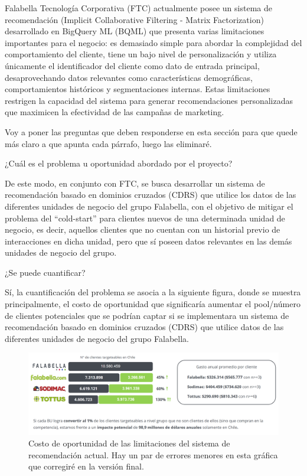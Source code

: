 \newpage

Falabella Tecnología Corporativa (FTC) actualmente posee un sistema de recomendación (Implicit Collaborative Filtering - Matrix Factorization) desarrollado en BigQuery ML (BQML) que presenta varias limitaciones importantes para el negocio: es demasiado simple para abordar la complejidad del comportamiento del cliente, tiene un bajo nivel de personalización y utiliza únicamente el identificador del cliente como dato de entrada principal, desaprovechando datos relevantes como características demográficas, comportamientos históricos y segmentaciones internas. Estas limitaciones restrigen la capacidad del sistema para generar recomendaciones personalizadas que maximicen la efectividad de las campañas de marketing.

Voy a poner las preguntas que deben responderse en esta sección para que quede más claro a que apunta cada párrafo, luego las eliminaré.

¿Cuál es el problema u oportunidad abordado por el proyecto?

De este modo, en conjunto con FTC, se busca desarrollar un sistema de recomendación basado en dominios cruzados (CDRS) que utilice los datos de las diferentes unidades de negocio del grupo Falabella, con el objetivo de mitigar el problema del \enquote{cold-start} para clientes nuevos de una determinada unidad de negocio, es decir, aquellos clientes que no cuentan con un historial previo de interacciones en dicha unidad, pero que sí poseen datos relevantes en las demás unidades de negocio del grupo. 

¿Se puede cuantificar?

Sí, la cuantificación del problema se asocia a la siguiente figura, donde se muestra principalmente, el costo de oportunidad que significaría aumentar el pool/número de clientes potenciales que se podrían captar si se implementara un sistema de recomendación basado en dominios cruzados (CDRS) que utilice datos de las diferentes unidades de negocio del grupo Falabella.

\begin{figure}[th]
	\centering
	\includegraphics[width=\textwidth]{Figures/grafica Matias.png}
	\caption{Costo de oportunidad de las limitaciones del sistema de recomendación actual. Hay un par de errores menores en esta gráfica que corregiré en la versión final.}
	\label{fig:Limitaciones_Sistema_Actual}
\end{figure}

